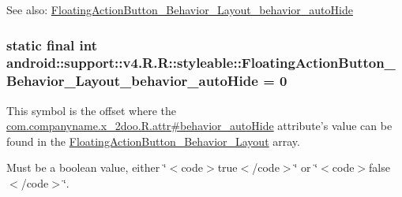 \begin{Desc}
\item[See also:]\hyperlink{classandroid_1_1support_1_1v4_1_1_r_1_1styleable_be88362aba18b70cdf8373813b961911}{FloatingActionButton\_\-Behavior\_\-Layout\_\-behavior\_\-autoHide} \end{Desc}
\hypertarget{classandroid_1_1support_1_1v4_1_1_r_1_1styleable_be88362aba18b70cdf8373813b961911}{
\subsubsection[{FloatingActionButton\_\-Behavior\_\-Layout\_\-behavior\_\-autoHide}]{\setlength{\rightskip}{0pt plus 5cm}static final int android::support::v4.R.R::styleable::FloatingActionButton\_\-Behavior\_\-Layout\_\-behavior\_\-autoHide = 0}}
\label{classandroid_1_1support_1_1v4_1_1_r_1_1styleable_be88362aba18b70cdf8373813b961911}


This symbol is the offset where the \hyperlink{classcom_1_1companyname_1_1x__2doo_1_1_r_1_1attr_edb4a73e35e4021aa727f197082f8de3}{com.companyname.x\_\-2doo.R.attr\#behavior\_\-autoHide} attribute's value can be found in the \hyperlink{classandroid_1_1support_1_1v4_1_1_r_1_1styleable_74fa04356d75314efc459f06cb2b13ea}{FloatingActionButton\_\-Behavior\_\-Layout} array.

Must be a boolean value, either \char`\"{}$<$code$>$true$<$/code$>$\char`\"{} or \char`\"{}$<$code$>$false$<$/code$>$\char`\"{}. 

